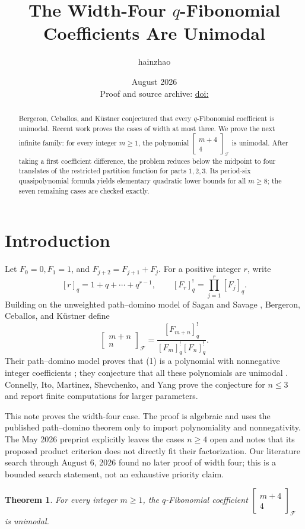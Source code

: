 \documentclass[11pt]{article}
\title{The Width-Four \(q\)-Fibonomial Coefficients Are Unimodal}
\author{hainzhao}
\date{August 2026\\[4pt]
\small Proof and source archive:
\href{https://doi.org/\archivedoi}{doi:\archivedoi}}
\newtheorem{theorem}{Theorem}
\newcommand{\qint}[1]{[#1]_q}
\newcommand{\qfib}[2]{\left[\!\begin{matrix}#1\\#2\end{matrix}\!\right]_{\!\mathcal F}}
\begin{document}
\maketitle

\begin{abstract}
Bergeron, Ceballos, and K\"ustner conjectured that every
\(q\)-Fibonomial coefficient is unimodal.  Recent work proves the cases of
width at most three.  We prove the next infinite family: for every integer
\(m\geq1\), the polynomial \(\qfib{m+4}{4}\) is unimodal.  After taking a
first coefficient difference, the problem reduces below the midpoint to four
translates of the restricted partition function for parts \(1,2,3\).  Its
period-six quasipolynomial formula yields elementary quadratic lower bounds
for all \(m\geq8\); the seven remaining cases are checked exactly.
\end{abstract}

\section{Introduction}

Let \(F_0=0,F_1=1\), and \(F_{j+2}=F_{j+1}+F_j\).  For a positive integer
\(r\), write
\[
  \qint r=1+q+\cdots+q^{r-1},\qquad
  [F_r]^!_q=\prod_{j=1}^r [F_j]_q.
\]
Building on the unweighted path--domino model of Sagan and Savage
\cite{SaganSavage}, Bergeron, Ceballos, and K\"ustner define
\[
  \qfib{m+n}{n}
  =\frac{[F_{m+n}]^!_q}{[F_m]^!_q[F_n]^!_q}.
  \tag{1}
\]
Their path--domino model proves that (1) is a polynomial with nonnegative
integer coefficients \cite[Theorem~2.4]{BCK}; they conjecture that all these
polynomials are unimodal \cite[Conjecture~2.5]{BCK}.  Connelly, Ito,
Martinez, Shevchenko, and Yang prove the conjecture for \(n\leq3\)
\cite[Theorem~1.2]{CIMSY} and report finite computations for larger parameters.

This note proves the width-four case.  The proof is algebraic and uses the
published path--domino theorem only to import polynomiality and nonnegativity.
The May 2026 preprint \cite{CIMSY} explicitly leaves the cases \(n\geq4\)
open and notes that its proposed product criterion does not directly fit
their factorization.  Our literature search through August 6, 2026 found no
later proof of width four; this is a bounded search statement, not an
exhaustive priority claim.

\begin{theorem}\label{thm:main}
For every integer \(m\geq1\), the \(q\)-Fibonomial coefficient
\(\qfib{m+4}{4}\) is unimodal.
\end{theorem}
\end{document}
